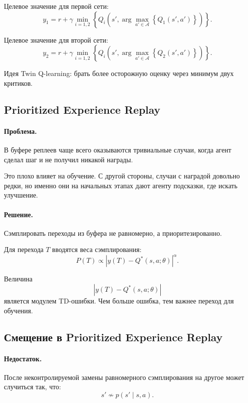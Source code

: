 \documentclass[12pt,a4paper]{article}
\begin{document}
Целевое значение для первой сети:
\[
y_1
=
r
+
\gamma
\min_{i=1,2}
\left\{
Q_i
\left(
s',
\arg\max_{a' \in \mathcal A}
\left\{
Q_1(s',a')
\right\}
\right)
\right\}.
\]

Целевое значение для второй сети:
\[
y_2
=
r
+
\gamma
\min_{i=1,2}
\left\{
Q_i
\left(
s',
\arg\max_{a' \in \mathcal A}
\left\{
Q_2(s',a')
\right\}
\right)
\right\}.
\]

Идея Twin Q-learning: брать более осторожную оценку через минимум двух критиков.

\subsection{Prioritized Experience Replay}

\paragraph{Проблема.}

В буфере реплеев чаще всего оказываются тривиальные случаи, когда агент сделал шаг и не получил никакой награды.

Это плохо влияет на обучение. С другой стороны, случаи с наградой довольно редки, но именно они на начальных этапах дают агенту подсказки, где искать улучшение.

\paragraph{Решение.}

Сэмплировать переходы из буфера не равномерно, а приоритезированно.

Для перехода $T$ вводятся веса сэмплирования:
\[
P(T)
\propto
\left|
y(T)
-
Q^\ast(s,a;\theta)
\right|^\alpha.
\]

Величина
\[
\left|
y(T)
-
Q^\ast(s,a;\theta)
\right|
\]
является модулем TD-ошибки. Чем больше ошибка, тем важнее переход для обучения.

\subsection{Смещение в Prioritized Experience Replay}

\paragraph{Недостаток.}

После неконтролируемой замены равномерного сэмплирования на другое может случиться так, что:
\[
s' \not\sim p(s'\mid s,a).
\]
\end{document}
